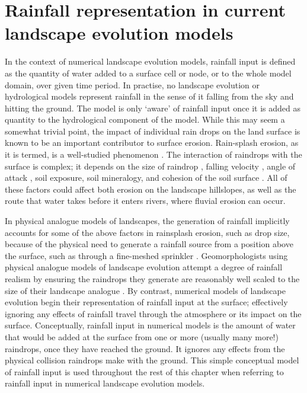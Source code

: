 \chapter{Rainfall representation in current landscape evolution models}
\label{chapter_RainfallInLEMs}


In the context of numerical landscape evolution models, rainfall input is defined as the quantity of water added to a surface cell or node, or to the whole model domain, over given time period. In practise, no landscape evolution or hydrological models represent rainfall in the sense of it falling from the sky and hitting the ground. The model is only `aware' of rainfall input once it is added as quantity to the hydrological component of the model.  While this may seem a somewhat trivial point, the impact of individual rain drops on the land surface is known to be an important contributor to surface erosion. Rain-splash erosion, as it is termed, is a well-studied phenomenon \citep{morgan1978field, meyer1981rain}. The interaction of raindrops with the surface is complex; it depends on the size of raindrop \citep{morgan1998european}, falling velocity \citep{park1983rainfall}, angle of attack \citep{pedersen1995influence}, soil exposure, soil mineralogy, and cohesion of the soil surface \citep{luk1979effect}. All of these factors could affect both erosion on the landscape hillslopes, as well as the route that water takes before it enters rivers, where fluvial erosion can occur. 

In physical analogue models of landscapes, the generation of rainfall implicitly accounts for some of the above factors in rainsplash erosion, such as drop size, because of the physical need to generate a rainfall source from a position above the surface, such as through a fine-meshed sprinkler \citep[e.g.][]{hancock2001use}. Geomorphologists using physical analogue models of landscape evolution attempt a degree of rainfall realism by ensuring the raindrops they generate are reasonably well scaled to the size of their landscape analogue \citep{meyer1994rainfall}. By contrast, numerical models of landscape evolution begin their representation of rainfall input at the surface; effectively ignoring any effects of rainfall travel through the atmosphere or its impact on the surface. Conceptually, rainfall input in numerical models is the amount of water that would be added at the surface from one or more (usually many more!) raindrops, once they have reached the ground. It ignores any effects from the physical collision raindrops make with the ground. This simple conceptual model of rainfall input is used throughout the rest of this chapter when referring to rainfall input in numerical landscape evolution models.

